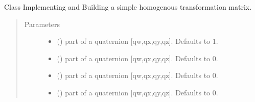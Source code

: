\documentclass[letterpaper,10pt,english]{sphinxmanual}
\begin{document}
\begin{fulllineitems}
\label{\detokenize{code_docu:trip_kinematics.HomogenTransformationMatrix.TransformationMatrix}}
Class Implementing and Building a simple homogenous transformation matrix.
\begin{quote}\begin{description}
\item[{Parameters}] \leavevmode\begin{itemize}
\item {} 
 (\sphinxstyleliteralemphasis{\sphinxupquote{, }}) \textendash{} part of a quaternion {[}qw,qx,qy,qz{]}. Defaults to 1.

\item {} 
 (\sphinxstyleliteralemphasis{\sphinxupquote{, }}) \textendash{} part of a quaternion {[}qw,qx,qy,qz{]}. Defaults to 0.

\item {} 
 (\sphinxstyleliteralemphasis{\sphinxupquote{, }}) \textendash{} part of a quaternion {[}qw,qx,qy,qz{]}. Defaults to 0.

\item {} 
 (\sphinxstyleliteralemphasis{\sphinxupquote{, }}) \textendash{} part of a quaternion {[}qw,qx,qy,qz{]}. Defaults to 0.


\end{itemize}
\end{description}
\end{quote}
\end{fulllineitems}
\end{document}
